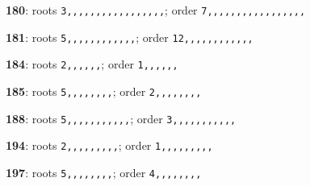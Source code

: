 \noindent \textbf{180}: roots \texttt{3,,,,,,,,,,,,,,,,,}; order \texttt{7,,,,,,,,,,,,,,,,,}\par
\noindent \textbf{181}: roots \texttt{5,,,,,,,,,,,,}; order \texttt{12,,,,,,,,,,,,}\par
\noindent \textbf{184}: roots \texttt{2,,,,,,}; order \texttt{1,,,,,,}\par
\noindent \textbf{185}: roots \texttt{5,,,,,,,,}; order \texttt{2,,,,,,,,}\par
\noindent \textbf{188}: roots \texttt{5,,,,,,,,,,,}; order \texttt{3,,,,,,,,,,,}\par
\noindent \textbf{194}: roots \texttt{2,,,,,,,,,}; order \texttt{1,,,,,,,,,}\par
\noindent \textbf{197}: roots \texttt{5,,,,,,,,}; order \texttt{4,,,,,,,,}\par
